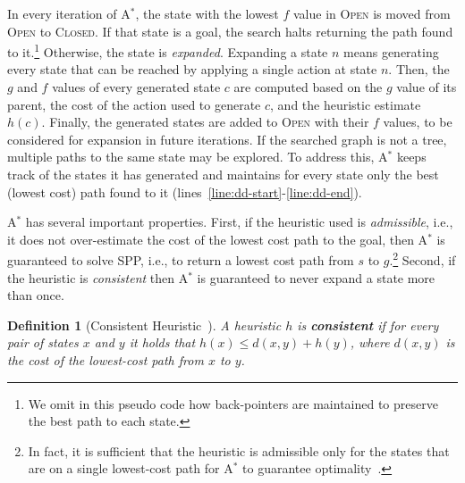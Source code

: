 \documentclass{aicom2e}
\newtheorem{definition}{Definition}
\newcommand{\astar}{A$^*$}
\newcommand{\open}{\textsc{Open}}
\newcommand{\closed}{\textsc{Closed}}
\newcommand{\roni}[1]{\textbf{[RS:#1]}}
\begin{document}
In every iteration of \astar{}, the state with the lowest $f$ value in \open{}
is moved from \open{} to \closed{}. If that state is a goal, the search halts
returning the path found to it.\footnote{We omit in this pseudo code how
back-pointers are maintained to  preserve the best path to each state.}
Otherwise, the state is {\em expanded}. Expanding a state $n$ means generating
every state that can be reached by applying a single action at state $n$. Then,
the $g$ and $f$ values of every generated state $c$ are computed based on the
$g$ value of its parent, the cost of the action used to generate $c$, and the
heuristic estimate $h(c)$. Finally, the generated states are added to \open{}
with their $f$ values, to be considered for expansion in future iterations. If
the searched graph is not a tree, multiple paths to the same state may be
explored. To address this, \astar{} keeps track of the states it has generated 
and maintains for every state only the best (lowest cost) path found to it (lines~\ref{line:dd-start}-\ref{line:dd-end}).









\astar{} has several important properties. First, if the heuristic used is {\em
admissible}, i.e., it does not over-estimate the cost of the lowest cost path
to the goal, then \astar{} is guaranteed to solve SPP, i.e., to return a lowest
cost path from $s$ to $g$.\footnote{In fact, it is sufficient that the
heuristic is admissible only for the states that are on a single lowest-cost
path for \astar{} to guarantee
optimality~\cite{karpas2012optimal,dechter1985generalizedBestFirst}.} Second,
if the heuristic is {\em consistent} then \astar{} is guaranteed to never
expand a state more than once.
\begin{definition}[Consistent Heuristic~\cite{hartNR68Astar}]
    A heuristic $h$ is {\bf consistent} if for every pair of states $x$ and $y$
    it holds that $h(x)\leq d(x,y)+h(y)$, where $d(x, y)$ is
    the cost of the lowest-cost path from $x$ to $y$.
    \label{def:consistent}
\end{definition}
\end{document}
